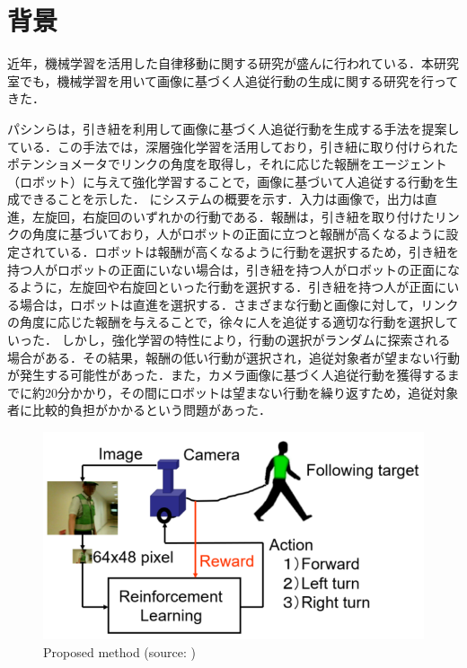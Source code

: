 
\section{背景}
  近年，機械学習を活用した自律移動に関する研究が盛んに行われている．本研究室でも，機械学習を用いて画像に基づく人追従行動の生成に関する研究を行ってきた．

  パシンら\cite{pasin1}\cite{pasin2}\cite{pasin3}は，引き紐を利用して画像に基づく人追従行動を生成する手法を提案している．この手法では，深層強化学習\cite{hado}を活用しており，引き紐に取り付けられたポテンショメータでリンクの角度を取得し，それに応じた報酬をエージェント（ロボット）に与えて強化学習\cite{leslie}することで，画像に基づいて人追従する行動を生成できることを示した．
  にシステムの概要を示す．入力は画像で，出力は直進，左旋回，右旋回のいずれかの行動である．報酬は，引き紐を取り付けたリンクの角度に基づいており，人がロボットの正面に立つと報酬が高くなるように設定されている．ロボットは報酬が高くなるように行動を選択するため，引き紐を持つ人がロボットの正面にいない場合は，引き紐を持つ人がロボットの正面になるように，左旋回や右旋回といった行動を選択する．引き紐を持つ人が正面にいる場合は，ロボットは直進を選択する．さまざまな行動と画像に対して，リンクの角度に応じた報酬を与えることで，徐々に人を追従する適切な行動を選択していった．
  しかし，強化学習の特性により，行動の選択がランダムに探索される場合がある．その結果，報酬の低い行動が選択され，追従対象者が望まない行動が発生する可能性があった．また，カメラ画像に基づく人追従行動を獲得するまでに約20分かかり，その間にロボットは望まない行動を繰り返すため，追従対象者に比較的負担がかかるという問題があった．

\newpage

  \begin{figure}[h]
    \centering
    \includegraphics[keepaspectratio, scale=0.45] {images/pasin_system.png}
    \caption[Proposed method]{Proposed method (source: \cite{pasin1})}
    \label{Fig:pasin_system}
  \end{figure}

